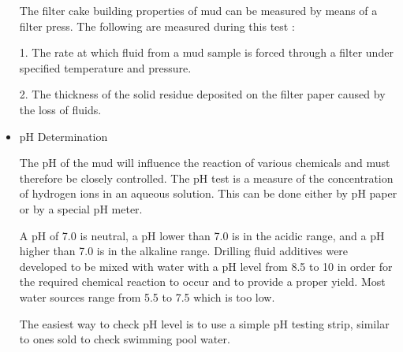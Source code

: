 \begin{itemize}
The filter cake building properties of mud can be measured by means of a filter press. The following are measured during this test :

1. The rate at which fluid from a mud sample is forced through a filter under specified temperature and pressure.

2. The thickness of the solid residue deposited on the filter paper caused by the loss of fluids.

\item pH Determination

The pH of the mud will influence the reaction of various chemicals and must therefore be closely controlled. The pH test is a measure of the concentration of hydrogen ions in an aqueous solution. This can be done either by pH paper or by a special pH meter.

\vspace{1em}

A pH of 7.0 is neutral, a pH lower than 7.0 is in the acidic range, and a pH higher than 7.0 is in 
the alkaline range. Drilling fluid additives were developed to be mixed with water with a pH level 
from 8.5 to 10 in order for the required chemical reaction to occur and to provide a proper yield. 
Most water sources range from 5.5 to 7.5 which is too low.

\vspace{1em}

The easiest way to check pH level is to use a simple pH testing strip, 
similar to ones sold to check swimming pool water. 
\end{itemize}
 
 
 
